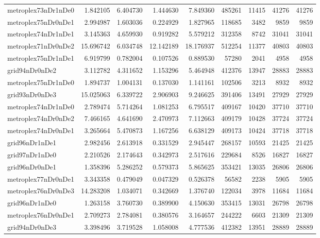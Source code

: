 \begin{longtable}{|l|r|r|r|r|r|r|r|r|}
metroplex73nDr1nDe0 & 1.842105 & 6.404730 & 1.444630 & 7.849360 & 485261 & 11415 & 41276 & 41276 \\
metroplex75nDr0nDe1 & 2.994987 & 1.603036 & 0.224929 & 1.827965 & 118685 & 3482 & 9859 & 9859 \\
metroplex74nDr1nDe1 & 3.145363 & 4.659930 & 0.919282 & 5.579212 & 312358 & 8742 & 31041 & 31041 \\
metroplex71nDr0nDe2 & 15.696742 & 6.034748 & 12.142189 & 18.176937 & 512254 & 11377 & 40803 & 40803 \\
metroplex75nDr1nDe1 & 6.919799 & 0.782004 & 0.107526 & 0.889530 & 57280 & 2041 & 4958 & 4958 \\
grid94nDr0nDe2 & 3.112782 & 4.311652 & 1.153296 & 5.464948 & 412376 & 13947 & 28883 & 28883 \\
metroplex75nDr1nDe0 & 1.894737 & 1.004131 & 0.137030 & 1.141161 & 102506 & 3213 & 8932 & 8932 \\
grid93nDr0nDe3 & 15.025063 & 6.339722 & 2.906903 & 9.246625 & 391406 & 13491 & 27929 & 27929 \\
metroplex74nDr1nDe0 & 2.789474 & 5.714264 & 1.081253 & 6.795517 & 409167 & 10420 & 37710 & 37710 \\
metroplex74nDr0nDe2 & 7.466165 & 4.641690 & 2.470973 & 7.112663 & 409179 & 10428 & 37724 & 37724 \\
metroplex74nDr0nDe1 & 3.265664 & 5.470873 & 1.167256 & 6.638129 & 409173 & 10424 & 37718 & 37718 \\
grid96nDr1nDe1 & 2.982456 & 2.613918 & 0.331529 & 2.945447 & 268157 & 10593 & 21425 & 21425 \\
grid97nDr1nDe0 & 2.210526 & 2.174643 & 0.342973 & 2.517616 & 229684 & 8526 & 16827 & 16827 \\
grid96nDr0nDe1 & 1.358396 & 5.286252 & 0.579373 & 5.865625 & 353421 & 13035 & 26806 & 26806 \\
metroplex77nDr0nDe1 & 3.343358 & 0.479049 & 0.047329 & 0.526378 & 56582 & 2238 & 5905 & 5905 \\
metroplex76nDr0nDe3 & 14.283208 & 1.034071 & 0.342669 & 1.376740 & 122034 & 3978 & 11684 & 11684 \\
grid96nDr1nDe0 & 1.263158 & 3.760730 & 0.389900 & 4.150630 & 353415 & 13031 & 26798 & 26798 \\
metroplex76nDr0nDe1 & 2.709273 & 2.784081 & 0.380576 & 3.164657 & 244222 & 6603 & 21309 & 21309 \\
grid94nDr0nDe3 & 3.398496 & 3.719528 & 1.058008 & 4.777536 & 412382 & 13951 & 28889 & 28889 \\

\end{longtable}
